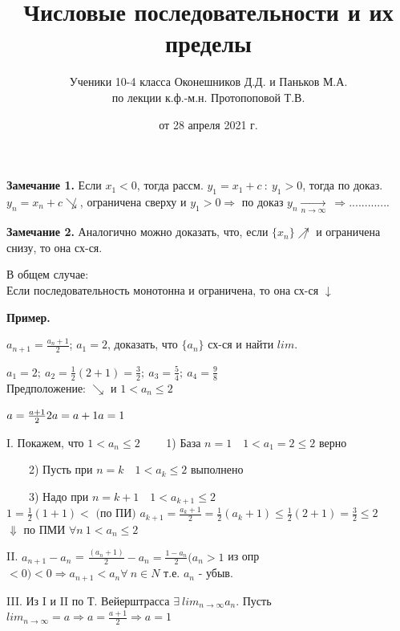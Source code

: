 \documentclass{article}
\begin{document}
    \textbf{Замечание 1.} 
    Если \(x_1 < 0\), тогда рассм. \(y_1 = x_1 + c\ : \ y_1 > 0\), тогда по доказ. \( y_n = x_n + c \not\searrow \), ограничена сверху и \( y_1 > 0 \Rightarrow \) по доказ \(y_n \xrightarrow[n \rightarrow \infty]{}\ \Rightarrow ............. \)
    
    \textbf{Замечание 2.}
    Аналогично можно доказать, что, если \(\{x_n\} \not\nearrow\) и ограничена снизу, то она сх-ся.
    
    В общем случае:
    \\ Если последовательность монотонна и ограничена, то она сх-ся \(\downarrow\)
    
    \textbf{Пример.}

    \(a_{n+1} = \frac{a_n + 1}{2}\); \(a_1 = 2\), доказать, что \(\{a_n\}\) сх-ся и найти \(lim\).

    \(a_1 = 2;\ a_2 = \frac{1}{2}(2+1) = \frac{3}{2};\ a_3 = \frac{5}{4};\ a_4 = \frac{9}{8}\)
    \\ Предположение: \(\searrow\) и \(1 < a_n \leq 2\)

    \(a = \frac{a+1}{2} \\ 2a = a + 1 \\ a = 1\)

    I. Покажем, что \(1 < a_n \leq 2\)
    \ \ \ \ 1) База \(n = 1 \quad 1 < a_1 = 2 \leq 2\) верно

    \ \ \ \ 2) Пусть при \(n = k \quad 1 < a_k \leq 2\) выполнено

    \ \ \ \ 3) Надо при \(n = k + 1 \quad 1 < a_{k+1} \leq 2\)
    \\ \(1 = \frac{1}{2}(1+1) < \textrm{ (по ПИ) } a_{k+1} = \frac{a_k + 1}{2} = \frac{1}{2}(a_k + 1) \leq \frac{1}{2}(2 + 1) = \frac{3}{2} \leq 2\)
    \\ \(\Downarrow\) по ПМИ \(\forall n \ 1 < a_n \leq 2\)

    II. \( a_{n+1} - a_n \) = \( \frac{(a_n+1)}{2} - a_n = \frac{1-a_n}{2} (a_n > 1\) из опр \(<0) < 0 \Rightarrow a_{n+1} < a_n \forall\ n \in N \) т.е. \( a_n \) - убыв.

    III. Из I и II по Т. Вейерштрасса \( \exists\ lim_{n \rightarrow \infty}a_n \). Пусть \(lim_{n \rightarrow \infty } = a \Rightarrow a = \frac{a + 1}{2} \Rightarrow a = 1 \)


\title{Числовые последовательности и их пределы}
\author{Ученики 10-4 класса Оконешников Д.Д. и Паньков М.А.\\ по лекции к.ф.-м.н. Протопоповой Т.В.}
\date{от 28 апреля 2021 г.}
\maketitle
\end{document}
